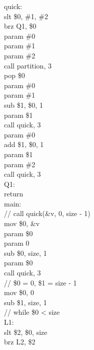 \documentclass[12pt,a4paper,extrafontsizes,article]{memoir}
\begin{document}
{{\color{red}quick:}\\
{\color{violet}slt} \$0, \#1, \#2\\
{\color{violet}brz} Q1, \$0\\
{\color{violet}param} \#0\\
{\color{violet}param} \#1\\
{\color{violet}param} \#2\\
{\color{violet}call} partition, {\color{orange}3}\\
{\color{violet}pop} \$0\\
{\color{violet}param} \#0\\
{\color{violet}param} \#1\\
{\color{violet}sub} \$1, \$0, {\color{orange}1}\\
{\color{violet}param} \$1\\
{\color{violet}call} quick, {\color{orange}3}\\
{\color{violet}param} \#0\\
{\color{violet}add} \$1, \$0, {\color{orange}1}\\
{\color{violet}param} \$1\\
{\color{violet}param} \#2\\
{\color{violet}call} quick, {\color{orange}3}\\
{\color{red}Q1:}\\
{\color{violet}return}\\
{\color{red}main:}\\
{\color{green!50!black}// call quick(\&v, 0, size - 1)}\\
{\color{violet}mov} \$0, \&v\\
{\color{violet}param} \$0\\
{\color{violet}param} {\color{orange}0}\\
{\color{violet}sub} \$0, size, {\color{orange}1}\\
{\color{violet}param} \$0\\
{\color{violet}call} quick, {\color{orange}3}\\
{\color{green!50!black}// \$0 = 0, \$1 = size - 1}\\
{\color{violet}mov} \$0, {\color{orange}0}\\
{\color{violet}sub} \$1, size, {\color{orange}1}\\
{\color{green!50!black}// while \$0 < size}\\
{\color{red}L1:}\\
{\color{violet}slt} \$2, \$0, size\\
{\color{violet}brz} L2, \$2\\
}
\end{document}
